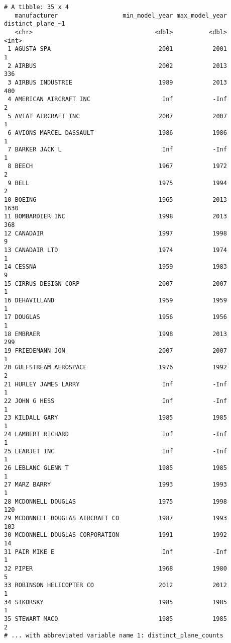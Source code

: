 \documentclass[
  letterpaper,
  DIV=11,
  numbers=noendperiod]{scrreprt}
\begin{document}
\begin{verbatim}
# A tibble: 35 x 4
   manufacturer                  min_model_year max_model_year distinct_plane_~1
   <chr>                                  <dbl>          <dbl>             <int>
 1 AGUSTA SPA                              2001           2001                 1
 2 AIRBUS                                  2002           2013               336
 3 AIRBUS INDUSTRIE                        1989           2013               400
 4 AMERICAN AIRCRAFT INC                    Inf           -Inf                 2
 5 AVIAT AIRCRAFT INC                      2007           2007                 1
 6 AVIONS MARCEL DASSAULT                  1986           1986                 1
 7 BARKER JACK L                            Inf           -Inf                 1
 8 BEECH                                   1967           1972                 2
 9 BELL                                    1975           1994                 2
10 BOEING                                  1965           2013              1630
11 BOMBARDIER INC                          1998           2013               368
12 CANADAIR                                1997           1998                 9
13 CANADAIR LTD                            1974           1974                 1
14 CESSNA                                  1959           1983                 9
15 CIRRUS DESIGN CORP                      2007           2007                 1
16 DEHAVILLAND                             1959           1959                 1
17 DOUGLAS                                 1956           1956                 1
18 EMBRAER                                 1998           2013               299
19 FRIEDEMANN JON                          2007           2007                 1
20 GULFSTREAM AEROSPACE                    1976           1992                 2
21 HURLEY JAMES LARRY                       Inf           -Inf                 1
22 JOHN G HESS                              Inf           -Inf                 1
23 KILDALL GARY                            1985           1985                 1
24 LAMBERT RICHARD                          Inf           -Inf                 1
25 LEARJET INC                              Inf           -Inf                 1
26 LEBLANC GLENN T                         1985           1985                 1
27 MARZ BARRY                              1993           1993                 1
28 MCDONNELL DOUGLAS                       1975           1998               120
29 MCDONNELL DOUGLAS AIRCRAFT CO           1987           1993               103
30 MCDONNELL DOUGLAS CORPORATION           1991           1992                14
31 PAIR MIKE E                              Inf           -Inf                 1
32 PIPER                                   1968           1980                 5
33 ROBINSON HELICOPTER CO                  2012           2012                 1
34 SIKORSKY                                1985           1985                 1
35 STEWART MACO                            1985           1985                 2
# ... with abbreviated variable name 1: distinct_plane_counts
\end{verbatim}
\end{document}
